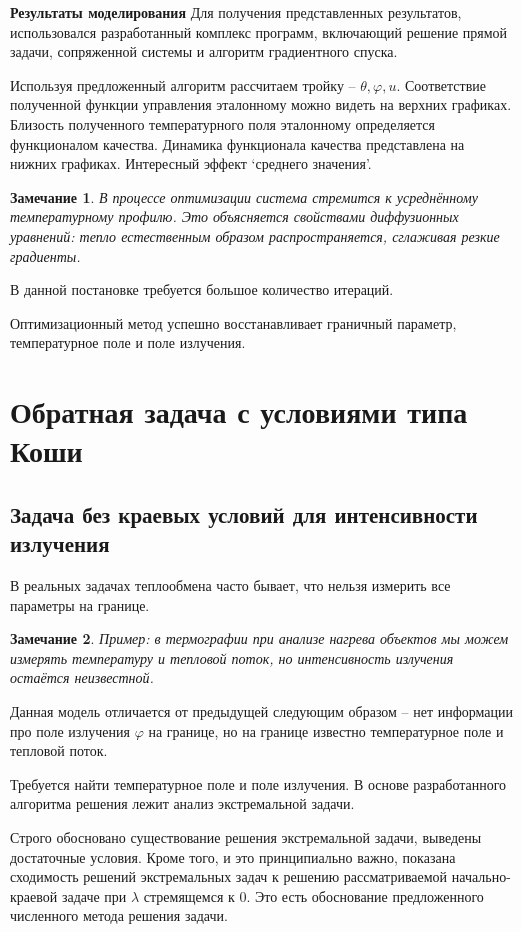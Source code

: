 \documentclass[8pt,a4paper]{article}
\newtheorem*{remark}{Замечание}
\begin{document}
    \textbf{Результаты моделирования}
    Для получения представленных результатов, использовался разработанный комплекс программ,
    включающий решение прямой задачи, сопряженной системы и алгоритм градиентного спуска.


    Используя предложенный алгоритм рассчитаем тройку -- $\theta, \varphi, u$.
    Соответствие полученной функции управления эталонному можно видеть на верхних графиках.
    Близость полученного температурного поля эталонному определяется функционалом качества.
    Динамика функционала качества представлена на нижних графиках.
    Интересный эффект `среднего значения'.
    \begin{remark}
        В процессе оптимизации система стремится к усреднённому температурному профилю.
        Это объясняется свойствами диффузионных уравнений: тепло естественным образом распространяется,
        сглаживая резкие градиенты.
    \end{remark}
    В данной постановке требуется большое количество итераций.

    Оптимизационный метод успешно восстанавливает граничный параметр, температурное поле и поле излучения.
    \section*{Обратная задача с условиями типа Коши}
    \subsection*{Задача без краевых условий для интенсивности излучения}
    В реальных задачах теплообмена часто бывает, что нельзя измерить все параметры на границе.


    \begin{remark}
    Пример: в термографии при анализе нагрева объектов мы можем измерять температуру и тепловой поток, но интенсивность излучения остаётся неизвестной.
    \end{remark}
    Данная модель отличается от предыдущей следующим образом -- нет информации про поле излучения $\varphi$ на границе,
    но на границе известно температурное поле и тепловой поток.

    Требуется найти температурное поле и поле излучения.
    В основе разработанного алгоритма решения лежит анализ экстремальной задачи.

    Строго обосновано существование решения экстремальной задачи, выведены достаточные условия.
    Кроме того, и это принципиально важно, показана сходимость решений экстремальных задач
    к решению рассматриваемой начально-краевой задаче при $\lambda$ стремящемся к 0.
    Это есть обоснование предложенного численного метода решения задачи.
\end{document}
